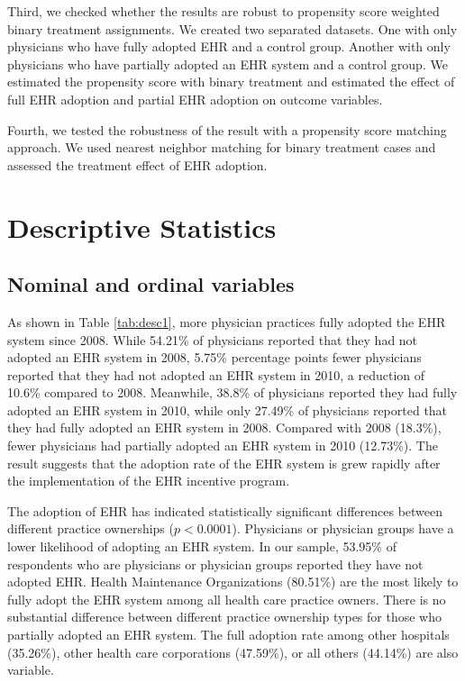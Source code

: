 \documentclass[12pt]{report}
\begin{document}
Third, we checked whether the results are robust to propensity score weighted binary treatment assignments. We created two separated datasets. One with only physicians who have fully adopted EHR and a control group. Another with only physicians who have partially adopted an EHR system and a control group. We estimated the propensity score with binary treatment and estimated the effect of full EHR adoption and partial EHR adoption on outcome variables.

Fourth, we tested the robustness of the result with a propensity score matching approach. We used nearest neighbor matching for binary treatment cases and assessed the treatment effect of EHR adoption.


\chapter{Descriptive Statistics}

\section{Nominal and ordinal variables}

As shown in Table \ref{tab:desc1}, more physician practices fully adopted the EHR system since 2008. While 54.21\% of physicians reported that they had not adopted an EHR system in 2008, 5.75\% percentage points fewer physicians reported that they had not adopted an EHR system in 2010, a reduction of 10.6\% compared to 2008. Meanwhile, 38.8\% of physicians reported they had fully adopted an EHR system in 2010, while only 27.49\% of physicians reported that they had fully adopted an EHR system in 2008. Compared with 2008 (18.3\%), fewer physicians had partially adopted an EHR system in 2010 (12.73\%). The result suggests that the adoption rate of the EHR system is grew rapidly after the implementation of the EHR incentive program.

The adoption of EHR has indicated statistically significant differences between different practice ownerships ($p<0.0001$). Physicians or physician groups have a lower likelihood of adopting an EHR system. In our sample, 53.95\% of respondents who are physicians or physician groups reported they have not adopted EHR. Health Maintenance Organizations (80.51\%) are the most likely to fully adopt the EHR system among all health care practice owners. There is no substantial difference between different practice ownership types for those who partially adopted an EHR system. The full adoption rate among other hospitals (35.26\%), other health care corporations (47.59\%), or all others (44.14\%) are also variable. 
\end{document}
